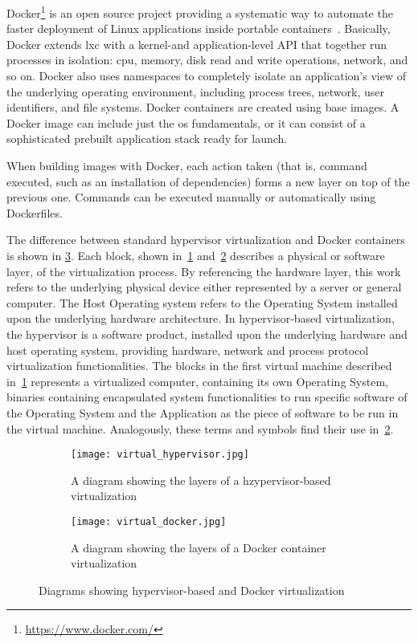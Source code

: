 \documentclass[
a4paper,
twoside,
headsepline,
cleardoublepage=empty,
parskip=half,
draft=false
]{scrbook}
\begin{document}
			Docker\footnote{\url{https://www.docker.com/}} is an open source project providing a systematic way to automate the faster deployment of Linux applications inside portable containers~\cite{bernstein2014containers}. 
			Basically, Docker extends \gls{lxc} with a kernel-and application-level API that together run processes in isolation: \gls{cpu}, memory, disk read and write operations, network, and so on. 
			Docker also uses namespaces to completely isolate an application’s view of the underlying operating environment, including process trees, network, user identifiers, and file systems.
			Docker containers are created using base images.
			A Docker image can include just the \gls{os} fundamentals, or it can consist of a sophisticated prebuilt application stack ready for launch. 
			
			When building images with Docker, each action taken (that is, command executed, such as an installation of dependencies) forms a new layer on top of the previous one. 
			Commands can be executed manually or automatically using Dockerfiles.
			
			The difference between standard hypervisor virtualization and Docker containers is shown in \cref{fig:virtualization}.
			Each block, shown in~\cref{subfig:hypervisor} and~\cref{subfig:docker} describes a physical or software layer, of the virtualization process. 
			By referencing the hardware layer, this work refers to the underlying physical device either represented by a server or general computer. 
			The Host Operating system refers to the Operating System installed upon the underlying hardware architecture.
			In hypervisor-based virtualization, the hypervisor is a software product, installed upon the underlying hardware and host operating system, providing hardware, network and process protocol virtualization functionalities.
			The blocks in the first virtual machine described in~\cref{subfig:hypervisor} represents a virtualized computer, containing its own Operating System, binaries containing encapsulated system functionalities to run specific software of the Operating System and the Application as the piece of software to be run in the virtual machine.
			Analogously, these terms and symbols find their use in~\cref{subfig:docker}.
			
			\begin{figure}[H]
				\centering
				\begin{subfigure}{0.45\textwidth}
					\centering
					\texttt{[image: virtual\_hypervisor.jpg]}
					\caption{A diagram showing the layers of a hzypervisor-based virtualization}
					\label{subfig:hypervisor}
				\end{subfigure}
				\hfill
				\begin{subfigure}{0.45\textwidth}
					\centering
					\texttt{[image: virtual\_docker.jpg]}
					\caption{A diagram showing the layers of a Docker container virtualization}
					\label{subfig:docker}
				\end{subfigure}
				\caption{Diagrams showing hypervisor-based and Docker virtualization}
				\label{fig:virtualization}
			\end{figure}
			
\end{document}
